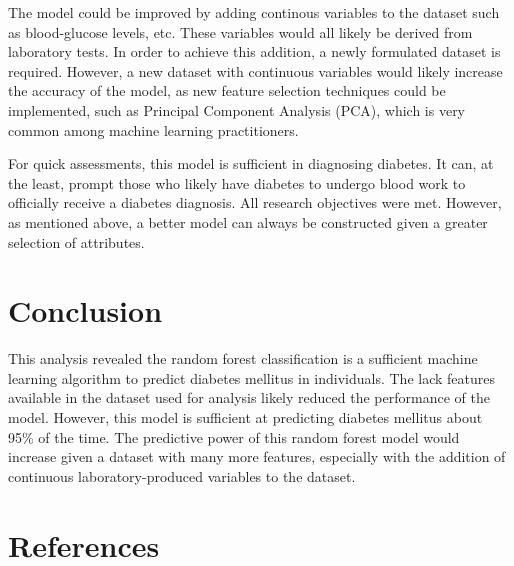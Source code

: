 \documentclass[
]{article}
\begin{document}
The model could be improved by adding continous variables to the dataset
such as blood-glucose levels, etc. These variables would all likely be
derived from laboratory tests. In order to achieve this addition, a
newly formulated dataset is required. However, a new dataset with
continuous variables would likely increase the accuracy of the model, as
new feature selection techniques could be implemented, such as Principal
Component Analysis (PCA), which is very common among machine learning
practitioners.

For quick assessments, this model is sufficient in diagnosing diabetes.
It can, at the least, prompt those who likely have diabetes to undergo
blood work to officially receive a diabetes diagnosis. All research
objectives were met. However, as mentioned above, a better model can
always be constructed given a greater selection of attributes.

\hypertarget{conclusion}{%
\section{Conclusion}\label{conclusion}}

This analysis revealed the random forest classification is a sufficient
machine learning algorithm to predict diabetes mellitus in individuals.
The lack features available in the dataset used for analysis likely
reduced the performance of the model. However, this model is sufficient
at predicting diabetes mellitus about 95\% of the time. The predictive
power of this random forest model would increase given a dataset with
many more features, especially with the addition of continuous
laboratory-produced variables to the dataset.

\hypertarget{references}{%
\section{References}\label{references}}
\end{document}
